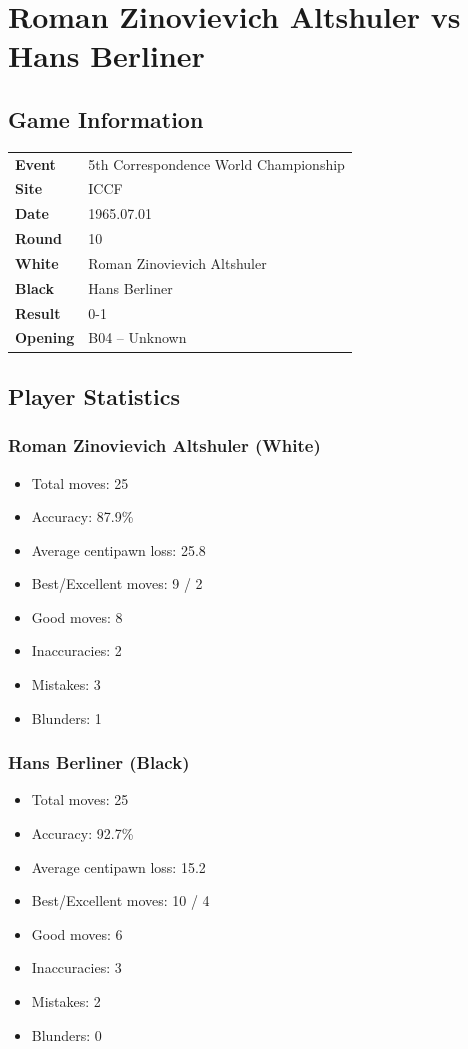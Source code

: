 \documentclass[11pt]{book}
\begin{document}
\chapter{Roman Zinovievich Altshuler vs Hans Berliner}

\section{Game Information}
\begin{tabular}{ll}
\textbf{Event} & 5th Correspondence World Championship \\
\textbf{Site} & ICCF \\
\textbf{Date} & 1965.07.01 \\
\textbf{Round} & 10 \\
\textbf{White} & Roman Zinovievich Altshuler \\
\textbf{Black} & Hans Berliner \\
\textbf{Result} & 0-1 \\
\textbf{Opening} & B04 -- Unknown \\
\end{tabular}

\section{Player Statistics}

\subsection{Roman Zinovievich Altshuler (White)}
\begin{itemize}
\item Total moves: 25
\item Accuracy: 87.9\%
\item Average centipawn loss: 25.8
\item Best/Excellent moves: 9 / 2
\item Good moves: 8
\item Inaccuracies: 2
\item Mistakes: 3
\item Blunders: 1
\end{itemize}

\subsection{Hans Berliner (Black)}
\begin{itemize}
\item Total moves: 25
\item Accuracy: 92.7\%
\item Average centipawn loss: 15.2
\item Best/Excellent moves: 10 / 4
\item Good moves: 6
\item Inaccuracies: 3
\item Mistakes: 2
\item Blunders: 0
\end{itemize}
\end{document}
